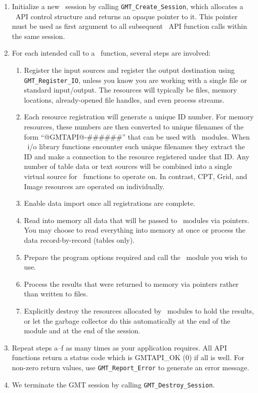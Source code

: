 \documentclass[11pt]{report}
\begin{document}
\begin{enumerate}
\item Initialize a new \GMT\ session by calling \texttt{GMT\_Create\_Session}, which
allocates a \GMT\ API control structure and returns an opaque pointer to it.  This pointer must be used
as first argument to all subsequent \GMT\ API function calls within the same session.
\item For each intended call to a \GMT\ function, several steps are involved:
\begin{enumerate}
\item Register the input sources and register the output destination
using \texttt{GMT\_Register\_IO}, unless you know you are working with a single file
or standard input/output.
The resources will typically be files, memory locations, already-opened file handles,
and even process streams.
\item Each resource registration will generate a unique ID number.  For memory resources, these numbers are
then converted to unique filenames of the form ``@GMTAPI@-\#\#\#\#\#\#'' that can be used with \GMT\ modules.  When
\GMT\ i/o library functions encounter such unique filenames they extract the ID and make a connection
to the resource registered under that ID.  Any number of table data or text sources
will be combined into a single virtual source for \GMT\ functions to operate on.
In contrast, CPT, Grid, and Image resources are operated on individually.
\item Enable data import once all registrations are complete.
\item Read into memory all data that will be passed to \GMT\ modules via pointers.  You may choose
	to read everything into memory at once or process the data record-by-record (tables only).
\item Prepare the program options required and call the \GMT\ module you wish to use.
\item Process the results that were returned to memory via pointers rather than written to files.
\item Explicitly destroy the resources allocated by \GMT\ modules to hold the results, or let the
garbage collector do this automatically at the end of the module and at the end of the session.
\end{enumerate}
\item Repeat steps a--f as many times as your application requires.  All API functions
return a status code which is GMTAPI\_OK (0) if all is well.  For non-zero return values, use
\texttt{GMT\_Report\_Error} to generate an error message.
\item We terminate the GMT session by calling \texttt{GMT\_Destroy\_Session}.
\end{enumerate}
\end{document}

